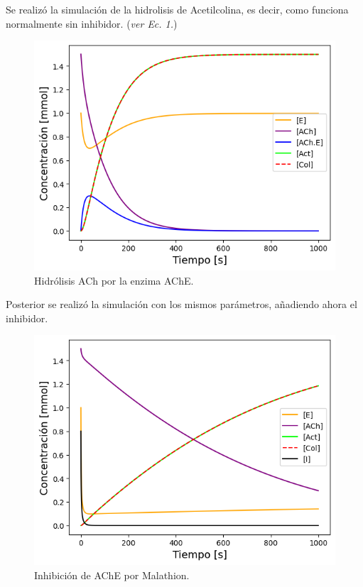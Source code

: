 Se realizó la simulación de la hidrolisis de Acetilcolina, es decir, como funciona normalmente sin inhibidor. (\textit{ver Ec. 1.})

\begin{figure}[h]
	\centering
	\includegraphics[width=\columnwidth]{img/simu_no_i.png}
	\caption{Hidrólisis ACh por la enzima AChE.}
	\label{3}
\end{figure}

Posterior se realizó la simulación con los mismos parámetros, añadiendo ahora el inhibidor.\\

\begin{figure}[h]
	\centering
	\includegraphics[width=\columnwidth]{img/simu_con_i.png}
	\caption{Inhibición de AChE por Malathion.}
	\label{4}
\end{figure}

